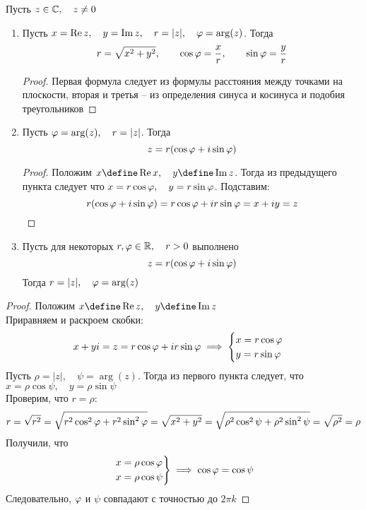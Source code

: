 \begin{theorem}
	Пусть $z \in \mathbb{C}, \quad z \ne 0 $
	\begin{enumerate}
		\item Пусть $x = \operatorname{Re} z, \quad y = \operatorname{Im} z, \quad r = |z|, \quad \varphi = \arg(z)$. Тогда
		$$ r = \sqrt{x^2 + y^2}, \qquad \cos \varphi = \frac{x}r, \qquad \sin \varphi = \frac{y}r $$
		\begin{proof}
			Первая формула следует из формулы расстояния между точками на плоскости, вторая и третья -- из определения синуса и косинуса и подобия треугольников
		\end{proof}
		\item Пусть $\varphi = \arg(z), \quad r = |z|$. Тогда
		$$ z = r(\cos \varphi + i \sin \varphi) $$
		\begin{proof}
			Положим $x \define \operatorname{Re} x, \quad y \define \operatorname{Im} z $. Тогда из предыдущего пункта следует что $x = r \cos \varphi, \quad y = r \sin \varphi $. Подставим:
			$$ r(\cos \varphi + i \sin \varphi) = r \cos \varphi + ir \sin \varphi = x + iy = z $$
		\end{proof}
		\item Пусть для некоторых $r, \varphi \in \mathbb{R}, \quad r > 0 $ выполнено
		$$ z = r(\cos \varphi + i \sin \varphi) $$
		Тогда $ r = |z|, \quad \varphi = \arg(z) $
	\end{enumerate}
	\begin{proof}
		Положим $x \define \operatorname{Re} z, \quad y \define \operatorname{Im} z $ \\
		Приравняем и раскроем скобки:
		$$ x + yi = z = r \cos \varphi + ir \sin \varphi \implies
		\begin{cases}
			x = r \cos \varphi \\
			y = r \sin \varphi
		\end{cases} $$
		Пусть $\rho = |z|, \quad \psi = \arg(z)$. Тогда из первого пункта следует, что $x = \rho \cos \psi, \quad y = \rho \sin \psi $ \\
		Проверим, что $ r = \rho $:
		$$ r = \sqrt{r^2} = \sqrt{r^2 \cos^2 \varphi + r^2 \sin^2 \varphi} = \sqrt{x^2 + y^2} = \sqrt{\rho^2 \cos^2 \psi + \rho^2 \sin^2 \psi} = \sqrt{\rho^2} = \rho $$
		Получили, что
		$$ \begin{rcases}
		   	x = \rho \cos \varphi \\
			x = \rho \cos \psi
		   \end{rcases} \implies \cos \varphi = \cos \psi $$
		Следовательно, $\varphi$ и $\psi$ совпадают с точностью до $2\pi k$
	\end{proof}
\end{theorem}


